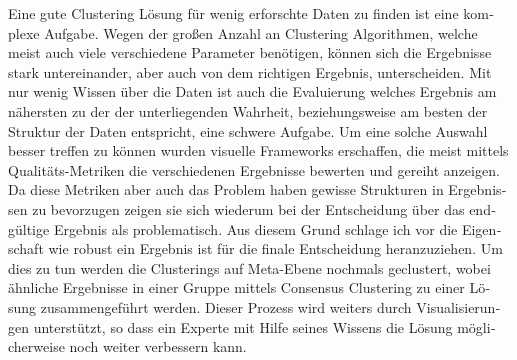 \iffalse  \fi

\begin{otherlanguage}{ngerman}

Eine gute Clustering Lösung für wenig erforschte Daten zu finden ist eine komplexe Aufgabe. Wegen der großen Anzahl an Clustering Algorithmen, welche meist auch viele verschiedene Parameter benötigen, können sich die Ergebnisse stark untereinander, aber auch von dem richtigen Ergebnis, unterscheiden. Mit nur wenig Wissen über die Daten ist auch die Evaluierung welches Ergebnis am nähersten zu der der unterliegenden Wahrheit, beziehungsweise am besten der Struktur der Daten entspricht, eine schwere Aufgabe.  Um eine solche Auswahl besser treffen zu können wurden visuelle Frameworks erschaffen, die meist mittels Qualitäts-Metriken die verschiedenen Ergebnisse bewerten und gereiht anzeigen. Da diese Metriken aber auch das Problem haben gewisse Strukturen in Ergebnissen zu bevorzugen zeigen sie sich wiederum bei der Entscheidung über das endgültige Ergebnis als problematisch. Aus diesem Grund schlage ich vor die Eigenschaft wie robust ein Ergebnis ist für die finale Entscheidung heranzuziehen. Um dies zu tun werden die Clusterings auf Meta-Ebene nochmals geclustert, wobei ähnliche Ergebnisse in einer Gruppe mittels Consensus Clustering zu einer Lösung zusammengeführt werden. Dieser Prozess wird weiters durch Visualisierungen unterstützt, so dass ein Experte mit Hilfe seines Wissens die Lösung möglicherweise noch weiter verbessern kann.

\end{otherlanguage}
